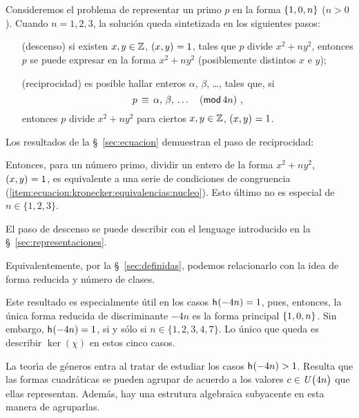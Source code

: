 \theoremstyle{plain}

\theoremstyle{definition}
\newtheorem{ejemResumen}{\ejemname}[section]


Consideremos el problema de representar un primo $p$ en la forma
$\binaria{1,0,n}$ ($n>0$). Cuando $n=1,2,3$, la soluci\'on queda
sintetizada en los siguientes pasos:
\begin{itemize}
	\item[(descenso)]
		si existen $x,y\in\Enteros$, $\mcd{x,y}=1$,
		tales que $p$ divide $x^2+ny^2$, entonces $p$ se
		puede expresar en la forma $x^2+ny^2$ (posiblemente
		distintos $x$ e $y$);
	\item[(reciprocidad)]
		es posible hallar enteros $\alpha$, $\beta$, \dots,
		tales que, si
		\begin{displaymath}
			p\,\equiv\,\alpha,\,\beta,\,\dots
				\modulo[4n]
			\dispcomma
		\end{displaymath}
		entonces $p$ divide $x^2+ny^2$ para ciertos
		$x,y\in\Enteros$, $\mcd{x,y}=1$.
\end{itemize}
%
Los resultados de la \S~\ref{sec:ecuacion} demuestran el paso
de reciprocidad:

\teoEcuacionKronecker*

Entonces, para un n\'umero primo, dividir un entero de la forma
$x^2+ny^2$, $\mcd{x,y}=1$, es equivalente a una serie de condiciones
de congruencia (\eqref{item:ecuacion:kronecker:equivalencias:nucleo}).
Esto \'ultimo no es especial de $n\in\{1,2,3\}$.

El paso de descenso se puede describir con el lenguage introducido en
la \S~\ref{sec:representaciones}.

\coroRepresentacionesDescenso*

Equivalentemente, por la \S~\ref{sec:definidas}, podemos relacionarlo
con la idea de forma reducida y n\'umero de clases.

\coroReducidasDescenso*

Este resultado es especialmente \'util en los casos
$\nClases(-4n)=1$, pues, entonces, la \'unica forma reducida de
discriminante $-4n$ es la forma principal $\binaria{1,0,n}$.
Sin embargo, $\nClases(-4n)=1$, si y s\'olo si
$n\in\{1,2,3,4,7\}$. Lo \'unico que queda es describir $\ker(\chi)$
en estos cinco casos.

La teor\'{\i}a de g\'eneros entra al tratar de estudiar los casos
$\nClases(-4n)>1$. Resulta que las formas cuadr\'aticas se pueden
agrupar de acuerdo a los valores $c\in\Unidadesmod[4n]$ que ellas
representan. Adem\'as, hay una estrutura algebraica subyacente en
esta manera de agruparlas.

